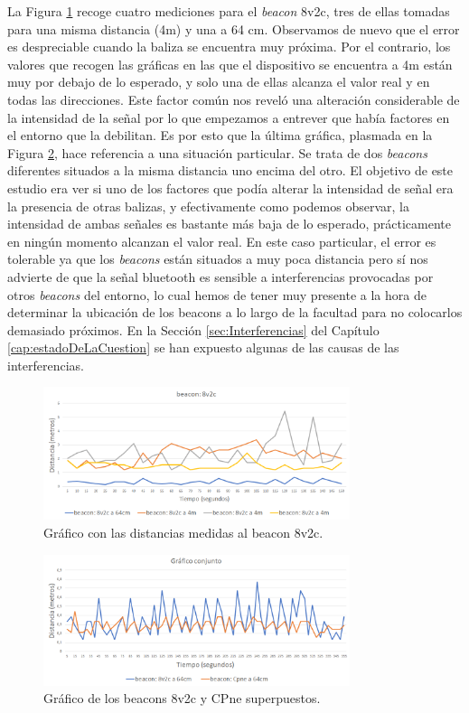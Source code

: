 La Figura \ref{fig:dist_8v2c} recoge cuatro mediciones para el \textit{beacon} 8v2c, tres de ellas tomadas para una misma distancia (4m) y una a 64 cm. Observamos de nuevo que el error es despreciable cuando la baliza se encuentra muy próxima. Por el contrario, los valores que recogen las gráficas en las que el dispositivo se encuentra a 4m están muy por debajo de lo esperado, y solo una de ellas alcanza el valor real y en todas las direcciones. Este factor común nos reveló una alteración considerable de la intensidad de la señal por lo que empezamos a entrever que había factores en el entorno que la debilitan. Es por esto que la última gráfica, plasmada en la Figura \ref{fig:dist_conjunto}, hace referencia a una situación particular. Se trata de dos \textit{beacons} diferentes situados a la misma distancia uno encima del otro. El objetivo de este estudio era ver si uno de los factores que podía alterar la intensidad de señal era la presencia de otras balizas, y efectivamente como podemos observar, la intensidad de ambas señales es bastante más baja de lo esperado, prácticamente en ningún momento alcanzan el valor real. En este caso particular, el error es tolerable ya que los \textit{beacons} están situados a muy poca distancia pero sí nos advierte de que la señal bluetooth es sensible a interferencias provocadas por otros \textit{beacons} del entorno, lo cual hemos de tener muy presente a la hora de determinar la ubicación de los beacons a lo largo de la facultad para no colocarlos demasiado próximos. En la Sección \ref{sec:Interferencias} del Capítulo \ref{cap:estadoDeLaCuestion} se han expuesto algunas de las causas de las interferencias.
\begin{figure}[t]
	\centering
	\includegraphics[width=0.8\textwidth]{Imagenes/Descripciondeltrabajo/dist_8v2c}
	\caption{Gráfico con las distancias medidas al beacon 8v2c. }
	\label{fig:dist_8v2c}
\end{figure}
\begin{figure}[t]
	\centering
	\includegraphics[width=0.8\textwidth]{Imagenes/Descripciondeltrabajo/dist_conjunto}
	\caption{Gráfico de los beacons 8v2c y CPne superpuestos. }
	\label{fig:dist_conjunto}
\end{figure}

